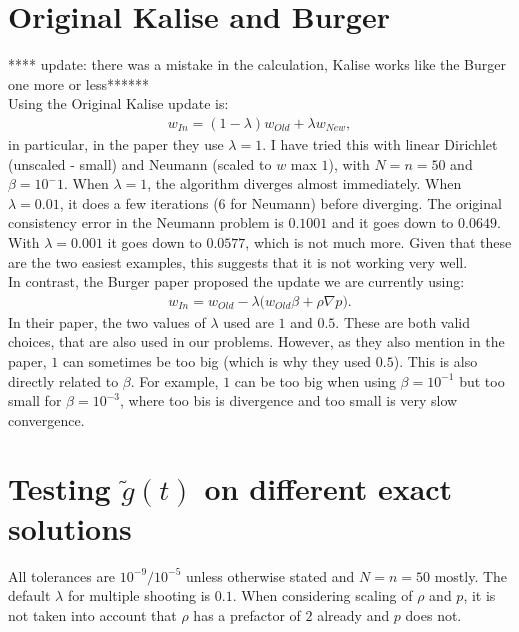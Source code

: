 \documentclass[11pt, a4paper]{article}
\theoremstyle{definition}
\begin{document}
\section{Original Kalise and Burger}
**** update: there was a mistake in the calculation, Kalise works like the Burger one more or less******\\
Using the Original Kalise update is:
\begin{align*}
w_{In} = (1 - \lambda)w_{Old} + \lambda w_{New},
\end{align*}
in particular, in the paper they use $\lambda = 1$. I have tried this with linear Dirichlet (unscaled - small) and Neumann (scaled to $w$ max $1$), with $N=n=50$ and $\beta = 10^-1$. When $\lambda =1$, the algorithm diverges almost immediately. When $\lambda = 0.01$, it does a few iterations ($6$ for Neumann) before diverging. The original consistency error in the Neumann problem is $0.1001$ and it goes down to $0.0649$. With $\lambda = 0.001$ it goes down to $0.0577$, which is not much more. Given that these are the two easiest examples, this suggests that it is not working very well.\\
In contrast, the Burger paper proposed the update we are currently using:
\begin{align*}
w_{In} = w_{Old} - \lambda \bigg(w_{Old} \beta + \rho \nabla p \bigg).
\end{align*}
In their paper, the two values of $\lambda$ used are $1$ and $0.5$. These are both valid choices, that are also used in our problems. However, as they also mention in the paper, $1$ can sometimes be too big (which is why they used $0.5$). This is also directly related to $\beta$. For example, $1$ can be too big when using $\beta = 10^{-1}$ but too small for $\beta = 10^{-3}$, where too bis is divergence and too small is very slow convergence.

\section{Testing $\tilde g(t)$ on different exact solutions}
All tolerances are $10^{-9}/10^{-5}$ unless otherwise stated and $N=n=50$ mostly. The default $\lambda$ for multiple shooting is $0.1$. When considering scaling of $\rho$ and $p$, it is not taken into account that $\rho$ has a prefactor of $2$ already and $p$ does not.
\end{document}
